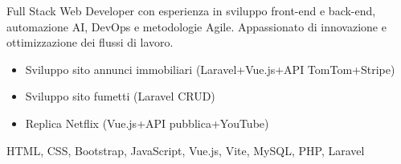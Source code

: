 \documentclass[10pt,a4paper,ragged2e,withhyper]{altacv}
\begin{document}
\makecvheader

Full Stack Web Developer con esperienza in sviluppo front-end e back-end, automazione AI, DevOps e metodologie Agile. Appassionato di innovazione e ottimizzazione dei flussi di lavoro.

        

\begin{itemize}
\item Sviluppo sito annunci immobiliari (Laravel+Vue.js+API TomTom+Stripe)
\item Sviluppo sito fumetti (Laravel CRUD)
\item Replica Netflix (Vue.js+API pubblica+YouTube)
\end{itemize}

HTML, CSS, Bootstrap, JavaScript, Vue.js, Vite, MySQL, PHP, Laravel
\end{document}
